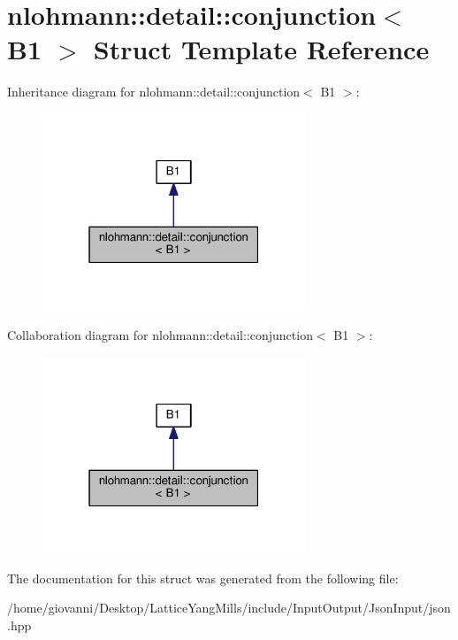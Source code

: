 \hypertarget{structnlohmann_1_1detail_1_1conjunction_3_01B1_01_4}{}\section{nlohmann\+:\+:detail\+:\+:conjunction$<$ B1 $>$ Struct Template Reference}
\label{structnlohmann_1_1detail_1_1conjunction_3_01B1_01_4}


Inheritance diagram for nlohmann\+:\+:detail\+:\+:conjunction$<$ B1 $>$\+:\nopagebreak
\begin{figure}[H]
\begin{center}
\leavevmode
\includegraphics[width=223pt]{structnlohmann_1_1detail_1_1conjunction_3_01B1_01_4__inherit__graph}
\end{center}
\end{figure}


Collaboration diagram for nlohmann\+:\+:detail\+:\+:conjunction$<$ B1 $>$\+:\nopagebreak
\begin{figure}[H]
\begin{center}
\leavevmode
\includegraphics[width=223pt]{structnlohmann_1_1detail_1_1conjunction_3_01B1_01_4__coll__graph}
\end{center}
\end{figure}


The documentation for this struct was generated from the following file\+:\begin{DoxyCompactItemize}
\item 
/home/giovanni/\+Desktop/\+Lattice\+Yang\+Mills/include/\+Input\+Output/\+Json\+Input/json.\+hpp\end{DoxyCompactItemize}
